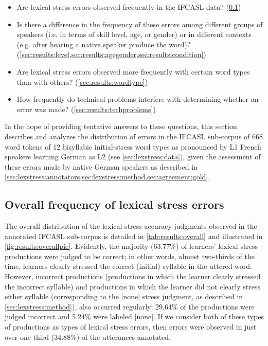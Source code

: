 		\begin{itemize}
	\item{Are lexical stress errors observed frequently in the IFCASL data? (\cref{sec:results:overall})}
	\item{Is there a difference in the frequency of these errors among different groups of speakers (i.e. in terms of skill level, age, or gender) or in different contexts (e.g. after hearing a native speaker produce the word)?  (\cref{sec:results:level,sec:results:agegender,sec:results:condition})}
	\item{Are lexical stress errors observed more frequently with certain word types than with others?  (\cref{sec:results:wordtype})}
	\item{How frequently do technical problems interfere with determining whether an error was made?  (\cref{sec:results:techproblems})}
	\end{itemize}
	
		In the hope of providing tentative answers to these questions, this section describes and analyzes the distribution of errors in the IFCASL sub-corpus of 668 word tokens of 12 bisyllabic initial-stress word types as pronounced by L1 French speakers learning German as L2 (see \cref{sec:lexstress:data}), given the assessment of these errors made by native German speakers as described in \cref{sec:lexstress:annotators,sec:lexstress:method,sec:agreement:gold}.
			
		\subsection{Overall frequency of lexical stress errors}
		\label{sec:results:overall}
		
		
		The overall distribution of the lexical stress accuracy judgments observed in the annotated IFCASL sub-corpus is detailed in \cref{tab:results:overall} and illustrated in \cref{fig:results:overallpie}. Evidently, the majority (63.77\%) of learners' lexical stress productions were judged to be correct; in other words, almost two-thirds of the time, learners 
		clearly stressed the correct (initial) syllable in the uttered word.
		However, incorrect productions (productions in which the learner clearly stressed the incorrect syllable) and productions in which the learner did not clearly stress either syllable (corresponding to the [none] stress judgment, as described in \cref{sec:lexstress:method}), also occurred regularly: 29.64\% of the productions were judged incorrect and 5.24\% were labeled [none]. If we consider both of these types of productions as types of lexical stress errors, then errors were observed in just over one-third (34.88\%) of the  utterances annotated. 
		

